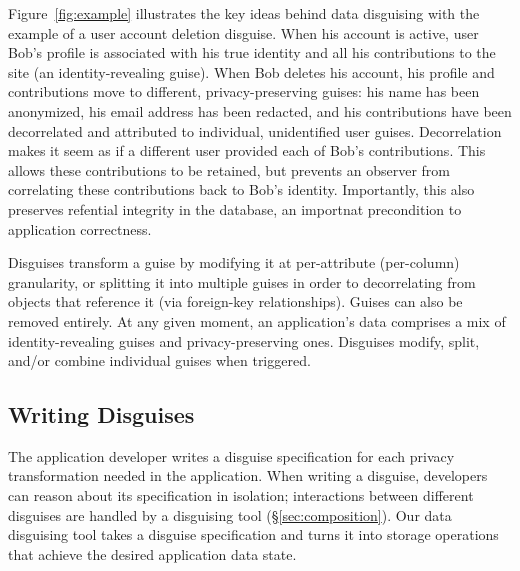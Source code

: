 %
%
%
%
Figure~\ref{fig:example} illustrates the key ideas behind data disguising with the example of a user
account deletion disguise.
%
When his account is active, user Bob's profile is associated with his true identity and all his
contributions to the site (an identity-revealing guise).
%
When Bob deletes his account, his profile and contributions move to different, privacy-preserving
guises: his name has been anonymized, his email address has been redacted, and his contributions
have been decorrelated and attributed to individual, unidentified user guises.
%
Decorrelation makes it seem as if a different user provided each of Bob's contributions.
%
This allows these contributions to be retained, but prevents an observer from correlating these
contributions back to Bob's identity.
%
Importantly, this also preserves refential integrity in the database, an importnat precondition
to application correctness.
%

%
Disguises transform a guise by modifying it at per-attribute (\ie per-column) granularity, or
splitting it into multiple guises in order to decorrelating from objects that reference it (via \eg foreign-key relationships).
%
Guises can also be removed entirely.
%
At any given moment, an application's data comprises a mix of identity-revealing guises
and privacy-preserving ones. Disguises modify, split, and/or combine individual guises when triggered.


\subsection{Writing Disguises}
\label{sec:disguises}
The application developer writes a disguise specification for each privacy transformation needed
in the application.
%
When writing a disguise, developers can reason about its
specification in isolation; interactions between different disguises are handled by a disguising
tool (\S\ref{sec:composition}).
%
%
Our data disguising tool takes a disguise specification and turns it into storage operations that
achieve the desired application data state.

